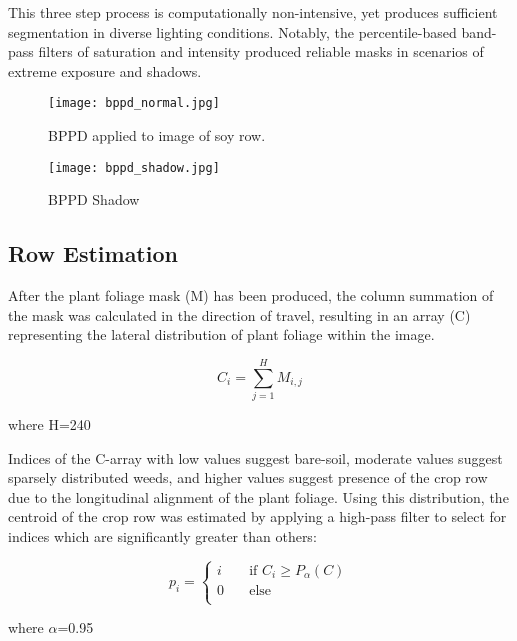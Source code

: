 This three step process is computationally non-intensive, yet produces
sufficient segmentation in diverse lighting conditions. Notably, the
percentile-based band-pass filters of saturation and intensity
produced reliable masks in scenarios of extreme exposure and shadows.

\begin{figure}
  \centering
  \texttt{[image: bppd\_normal.jpg]}
  \caption{BPPD applied to image of soy row.}
  \label{fig:bppd_normal}
\end{figure}

\begin{figure}
  \centering
  \texttt{[image: bppd\_shadow.jpg]}
  \caption{BPPD Shadow}
  \label{fig:bppd_shadow}
\end{figure}

\subsection{Row Estimation}
After the plant foliage mask (M) has been produced, the column
summation of the mask was calculated in the direction of travel,
resulting in an array (C) representing the lateral distribution of
plant foliage within the image. 

\begin{equation}
  C_{i} = \displaystyle\sum_{j=1}^{H} M_{i,j}
  \label{eq:col_sum}
\end{equation}
\begin{flushleft}
where H=240
\end{flushleft}

Indices of the C-array with low values suggest bare-soil, moderate
values suggest sparsely distributed weeds, and higher values suggest
presence of the crop row due to the longitudinal alignment of the
plant foliage. Using this distribution, the centroid of the crop row
was estimated by applying a high-pass filter to select for indices
which are significantly greater than others: 

\begin{equation}
  p_{i} =
  \begin{cases}
    i & \quad \text{if } C_{i} \geq P_{\alpha}(C) \\
    0 & \quad \text{else} \\
  \end{cases}
  \label{eq:p_threshold}
\end{equation}
\begin{flushleft}
where $\alpha$=0.95
\end{flushleft}


